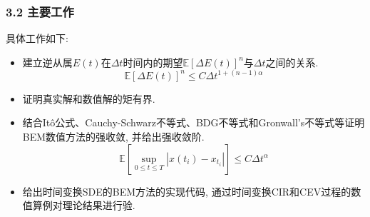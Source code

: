 \documentclass[notheorems,10pt,compress]{beamer}
\numberwithin{figure}{section}
\numberwithin{table}{section}
\numberwithin{equation}{section}
\numberwithin{theorem}{section}
\numberwithin{definition}{section}
\numberwithin{lemma}{section}
\numberwithin{proposition}{section}
\numberwithin{corollary}{section}
\theoremstyle{example}
\begin{document}
	\begin{frame}		
		\frametitle{ 3.2 主要工作}
		\setlength{\parindent}{2em}具体工作如下:
		\vskip 5pt
		\begin{itemize}
			\setlength{\itemsep}{5pt}
			\item 建立逆从属$E(t)$在$\Delta t$时间内的期望$\mathbb{E}\left[\Delta E(t)\right]^n$与$\Delta t$之间的关系.
			\begin{equation*}
				\mathbb{E}[\Delta E(t)]^n \le C\Delta t^{1+(n-1)\alpha}
			\end{equation*}
			\item 证明真实解和数值解的矩有界.
			\item 结合It\^{o}公式、Cauchy-Schwarz不等式、BDG不等式和Gronwall’s不等式等证明BEM数值方法的强收敛, 并给出强收敛阶.
			\begin{equation*}
					\mathbb{E}\left[\sup_{0\leq t\leq T}|x({t_i})-x_{t_i}|\right]\le C\Delta t^\alpha
			\end{equation*}
			\item 给出时间变换SDE的BEM方法的实现代码, 通过时间变换CIR和CEV过程的数值算例对理论结果进行验.
		\end{itemize}
	\end{frame}
	
%		
	
\end{document}
